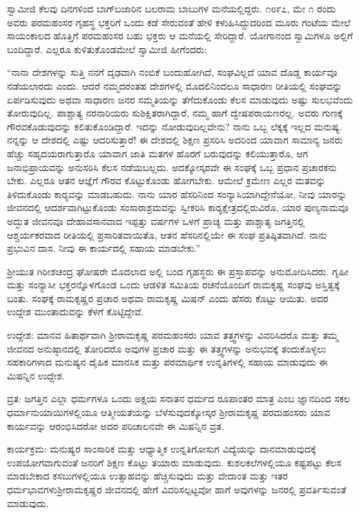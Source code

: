  ಸ್ವಾಮೀಜಿ ಕೆಲವು ದಿನಗಳಿಂದ ಬಾಗ್‍ಬಜಾರಿನ ಬಲರಾಮ ಬಾಬುಗಳ ಮನೆಯಲ್ಲಿದ್ದರು. ೧೮೯೭, ಮೇ ೧ ರಂದು ಅವರು ಪರಮಹಂಸರ ಗೃಹಸ್ಥ ಭಕ್ತರಿಗೆ ಒಂದು ಕಡೆ ಸೇರುವಂತೆ ಹೇಳಿ ಕಳುಹಿಸಿದ್ದುದರಿಂದ ಮೂರು ಗಂಟೆಯ ಮೇಲೆ ಸಾಯಂಕಾಲದ ಹೊತ್ತಿಗೆ ಪರಮಹಂಸರ ಬಹು ಭಕ್ತರು ಆ ಮನೆಯಲ್ಲಿ ಸೇರಿದ್ದಾರೆ. ಯೋಗಾನಂದ ಸ್ವಾಮಿಗಳೂ ಅಲ್ಲಿಗೆ ಬಂದಿದ್ದಾರೆ. ಎಲ್ಲರೂ ಕುಳಿತುಕೊಂಡಮೇಲೆ ಸ್ವಾಮೀಜಿ ಹೀಗೆಂದರು: 

 “ನಾನಾ ದೇಶಗಳನ್ನು ಸುತ್ತಿ ನನಗೆ ದೃಢವಾಗಿ ನಂಬಿಕೆ ಬಂದುಹೋಗಿದೆ, ಸಂಘವಿಲ್ಲದೆ ಯಾವ ದೊಡ್ಡ ಕಾರ್ಯವೂ ನಡೆಯಲಾರದು ಎಂದು. ಆದರೆ ನಮ್ಮದರಂತಹ ದೇಶಗಳಲ್ಲಿ ಮೊದಲಿನಿಂದಲೂ ಸಾಧಾರಣ ರೀತಿಯಲ್ಲಿ ಸಂಘವನ್ನು ಏರ್ಪಡಿಸುವುದು ಅಥವಾ ಸಾಧಾರಣ ಜನರ ಸಮ್ಮತಿಯನ್ನು ತೆಗೆದುಕೊಂಡು ಕೆಲಸ ಮಾಡುವುದು ಅಷ್ಟು ಸುಲಭವೆಂದು ತೋರುವುದಿಲ್ಲ. ಪಾಶ್ಚಾತ್ಯ ನರನಾರಿಯರು ಸುಶಿಕ್ಷಿತರಾಗಿದ್ದಾರೆ, ನಮ್ಮ ಹಾಗೆ ದ್ವೇಷಪರಾಯಣರಲ್ಲ. ಅವರು ಗುಣಕ್ಕೆ ಗೌರವಕೊಡುವುದನ್ನು ಕಲಿತುಕೊಂಡಿದ್ದಾರೆ. ಇದನ್ನು ನೋಡುವುದಿಲ್ಲವೇನು? ನಾನು ಒಬ್ಬ ಲೆಕ್ಕಕ್ಕೆ ಇಲ್ಲದ ಮನುಷ್ಯ. ನನ್ನನ್ನು ಆ ದೇಶದಲ್ಲಿ ಎಷ್ಟು ಆದರಿಸುತ್ತಾರೆ! ಈ ದೇಶದಲ್ಲಿ ಶಿಕ್ಷಣ ಪ್ರಸರಿಸಿ ಅದರಿಂದ ಯಾವಾಗ ಸಾಮಾನ್ಯ ಜನರು ಹೆಚ್ಚು ಸಹೃದಯರಾಗುತ್ತಾರೊ ಯಾವಾಗ ಜಾತಿ ಮತಗಳ ಹೊರಗೆ ಬರುವುದನ್ನು ಕಲಿಯುತ್ತಾರೊ, ಆಗ ಜನಾಭಿಪ್ರಾಯವನ್ನು ಅನುಸರಿಸಿ ಕೆಲಸ ನಡೆಯಬಲ್ಲದು. ಅದಕ್ಕೋಸ್ಕರವೇ ಈ ಸಂಘಕ್ಕೆ ಒಬ್ಬ ಪ್ರಧಾನ ಪ್ರಚಾರಕನು ಬೇಕು. ಎಲ್ಲರೂ ಆತನ ಆಜ್ಞೆಗೆ ಗೌರವ ಕೊಟ್ಟುಕೊಂಡು ಹೋಗಬೇಕು. ಆಮೇಲೆ ಕ್ರಮೇಣ ಎಲ್ಲರ ಮತವನ್ನು ತಿಳಿದುಕೊಂಡು ಕಾರ‍್ಯವನ್ನು ಮಾಡಬಹುದು. ನಾನು ಯಾರ ಹೆಸರಿನಿಂದ ಸಂನ್ಯಾಸಿಯಾಗಿದ್ದೇನೆಯೋ, ನೀವು ಯಾರನ್ನು ಜೀವನದಲ್ಲಿ ಆದರ್ಶವಾಗಿಟ್ಟುಕೊಂಡು ಸಂಸಾರಾಶ್ರಮವನ್ನು ಸ್ವೀಕರಿಸಿ ಕಾರ‍್ಯಕ್ಷೇತ್ರದಲ್ಲಿರುವಿರೊ, ಯಾರ ಪುಣ್ಯನಾಮವೂ ಅದ್ಭುತ ಜೀವನವೂ‌ ದೇಹಾವಸಾನವಾದ ಇಪ್ಪತ್ತು ವರ್ಷಗಳ ಒಳಗೆ ಪ್ರಾಚ್ಯ ಮತ್ತು ಪಾಶ್ಚಾತ್ಯ ಜಗತ್ತಿನಲ್ಲಿ ಆಶ್ಚರ್ಯಕರವಾದ ರೀತಿಯಲ್ಲಿ ಪ್ರಸಾರಿತವಾಯಿತೊ, ಆತನ ಹೆಸರಿನಲ್ಲಿಯೇ ಈ ಸಂಘ ಪ್ರತಿಷ್ಠಿತವಾಗಿದೆ. ನಾನು ಪ್ರಭುವಿನ ದಾಸ. ನೀವು ಈ ಕಾರ್ಯದಲ್ಲಿ ಸಹಾಯ ಮಾಡಬೇಕು.” 

 ಶ‍್ರೀಯುತ ಗಿರೀಶಚಂದ್ರ ಘೋಷರೇ ಮೊದಲಾದ ಅಲ್ಲಿ ಬಂದ ಗೃಹಸ್ಥರು ಈ ಪ್ರಸ್ತಾಪವನ್ನು ಅನುಮೋದಿಸಿದರು. ಗೃಹೀ ಮತ್ತು ಸಂನ್ಯಾಸೀ ಭಕ್ತರನ್ನೊಳಗೊಂಡ ಒಂದು ಆಡಳಿತ ಸಮಿತಿಯ ರಚನೆಯೊಂದಿಗೆ ರಾಮಕೃಷ್ಣ ಸಂಘವು ಅಸ್ತಿತ್ವಕ್ಕೆ ಬಂತು. ಸಂಘಕ್ಕೆ ರಾಮಕೃಷ್ಣರ ಪ್ರಚಾರ ಅಥವಾ ರಾಮಕೃಷ್ಣ ಮಿಷನ್ ಎಂದು ಹೆಸರು ಕೊಟ್ಟು ಆಯಿತು. ಅದರ ಉದ್ದೇಶ ಮುಂತಾದುವನ್ನು ಕೆಳಗೆ ಕೊಟ್ಟಿದ್ದೇವೆ. 

 ಉದ್ದೇಶ: ಮಾನವ ಹಿತಾರ್ಥವಾಗಿ ಶ‍್ರೀರಾಮಕೃಷ್ಣ ಪರಮಹಂಸರು ಯಾವ ತತ್ತ್ವಗಳನ್ನು ವಿವರಿಸಿದರೊ ಮತ್ತು ತಮ್ಮ ಜೀವನದ ಅನುಷ್ಠಾನದಲ್ಲಿ ತೋರಿದರೊ ಅವುಗಳ ಪ್ರಚಾರ ಮತ್ತು ಈ ತತ್ತ್ವಗಳನ್ನು ಅನುಭವಕ್ಕೆ ತಂದುಕೊಳ್ಳಲು ಸಹಕಾರಿಗಳಾದ ಮನುಷ್ಯನ ದೈಹಿಕ ಮಾನಸಿಕ ಮತ್ತು ಪರಮಾರ್ಥಿಕ ಉನ್ನತಿಗಳಲ್ಲಿ ಸಹಾಯ ಮಾಡುವುದು ಈ ಮಿಷನ್ನಿನ ಉದ್ದೇಶ. 

 ವ್ರತ: ಜಗತ್ತಿನ ಎಲ್ಲಾ ಧರ್ಮಗಳೂ ಒಂದು ಅಕ್ಷಯ ಸನಾತನ ಧರ್ಮದ ರೂಪಾಂತರ ಮಾತ್ರ ಎಂಬ ಜ್ಞಾನದಿಂದ ಸಕಲ ಧರ್ಮಾನುಯಾಯಿಗಳಲ್ಲಿಯೂ ಆತ್ಮೀಯತೆಯನ್ನು ಬೆಳೆಸುವುದಕ್ಕೋಸ್ಕರ ಶ‍್ರೀರಾಮಕೃಷ್ಣ ಪರಮಹಂಸರು ಯಾವ ಕಾರ್ಯವನ್ನು ಆರಂಭಿಸಿದರೋ ಅದರ ಪರಿಚಾಲನವೇ ಈ ಮಿಷನ್ನಿನ ವ್ರತ. 

 ಕಾರ್ಯಕ್ರಮ: ಮನುಷ್ಯರ ಸಾಂಸಾರಿಕ ಮತ್ತು ಆಧ್ಯಾತ್ಮಿಕ ಉನ್ನತಿಗೋಸುಗ ವಿದ್ಯೆಯನ್ನು ದಾನಮಾಡುವುದಕ್ಕೆ ಉಪಯೋಗವಾಗುವಂತೆ ಜನರಿಗೆ ಶಿಕ್ಷಣ ಕೊಟ್ಟು ತಯಾರು ಮಾಡುವುದು. ಕುಶಲಕಲೆಗಳಲ್ಲಿಯೂ ಕಷ್ಟಪಟ್ಟು ಕೆಲಸ ಮಾಡಬೇಕಾದ ಕಸಬುಗಳಲ್ಲಿಯೂ ಉತ್ಸಾಹವನ್ನು ಹೆಚ್ಚಿಸುವುದು ಮತ್ತು ವೇದಾಂತ ಮತ್ತು ಇತರ ಧರ್ಮಭಾವಗಳು\break ಶ‍್ರೀರಾಮಕೃಷ್ಣರ ಜೀವನದಲ್ಲಿ ಹೇಗೆ ವಿವರಿಸಲ್ಪಟ್ಟವೋ‌ ಹಾಗೆ ಅವುಗಳನ್ನು ಜನರಲ್ಲಿ ಪ್ರವರ್ತಿಸುವಂತೆ ಮಾಡುವುದು. 

